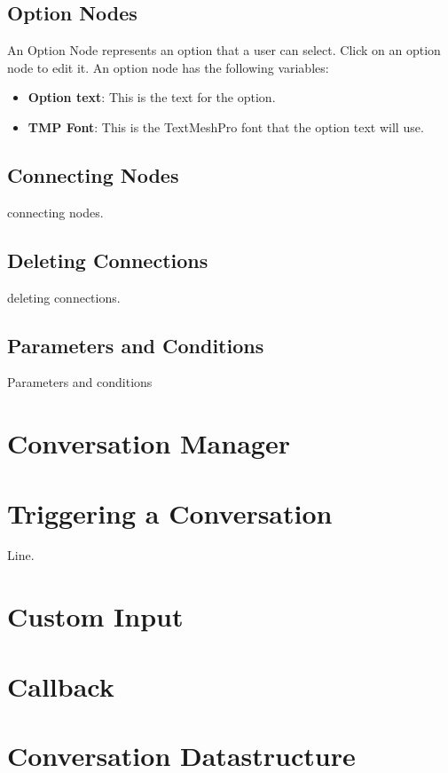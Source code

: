 \documentclass[a4paper,12pt]{article}
\begin{document}
\subsection{Option Nodes}
An Option Node represents an option that a user can select.
\newline
Click on an option node to edit it. An option node has the following variables:

\begin{itemize}
\setlength\itemsep{1pt}
	\item \textbf{Option text}: This is the text for the option.
	\item \textbf{TMP Font}: This is the TextMeshPro font that the option text will use.
\end{itemize}

\subsection{Connecting Nodes}
connecting nodes.

\subsection{Deleting Connections}
deleting connections.

\subsection{Parameters and Conditions}
Parameters and conditions

\newpage


\section{Conversation Manager}
\hypertarget{_conversationmanager}{}
\newpage

\section{Triggering a Conversation}
\hypertarget{_triggering}{}
Line.
\newpage

\section{Custom Input}
\hypertarget{_custominput}{}
\newpage

\section{Callback}
\hypertarget{_callbacks}{}
\newpage

\section{Conversation Datastructure}
\hypertarget{_datastructure}{}
\newpage
\end{document}
